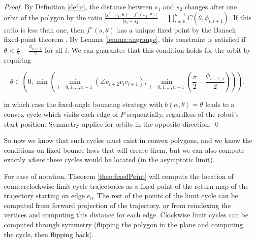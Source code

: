 \documentclass[sageh,times,Review]{sagej}
\begin{document}
\begin{proof}
By Definition \ref{def:c}, the distance between $s_1$ and $s_2$ changes after one orbit of the polygon by the
ratio $\frac{\lvert f^{n}(s_1, \theta) - f^{n}(s_2, \theta) \rvert}{ \lvert s_1
- s_2 \rvert } = \prod_{i = 0}^{n-1}
C(\theta, \phi_{i, i+1})$. If this ratio is less than one, then $f^n(s,\theta)$ has a unique fixed point by the Banach fixed-point theorem
\cite{Granas2003}. By Lemma \ref{lemma:angrange}, this constraint is satisfied if  
$\theta < \frac{\pi}{2}-\frac{\phi_{i, i+1}}{2}$ for all $i$. We can guarantee that this
condition holds for the orbit by requiring

\begin{equation*}
\theta \in (0, \min(\min_{i = 0, 1, \dots, n-1}(\angle v_{i+2}v_{i}v_{i+1}),
\min_{i = 0, 1, \dots, n-1}(\frac{\pi}{2}-\frac{\phi_{i-1, i}}{2}))),
\end{equation*}

\noindent
in which case the fixed-angle bouncing strategy with $b(\alpha, \theta) = \theta$ leads to a convex
cycle which visits each edge of $P$ sequentially, regardless of the robot's start position.
Symmetry applies for orbits in the opposite direction. \qed
\end{proof}

So now we know that such cycles must exist in convex polygons, and we know the 
conditions on fixed bounce laws that will create them, but we can also compute
exactly {\em where} these cycles would be located (in the asymptotic limit).

For ease of notation, Theorem \ref{theo:fixedPoint} will compute the location of
counterclockwise limit cycle trajectories as a fixed point of the return map of the trajectory
starting on edge $e_0$. The rest of the points of the limit cycle can
be computed from forward projection of the trajectory, or from reindexing the
vertices and computing this distance for each edge. Clockwise limit cycles can
be computed through symmetry (flipping the polygon in the plane and computing
the cycle, then flipping back).
\end{document}
